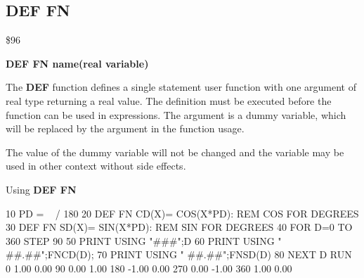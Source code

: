 
\newpage
\subsection{DEF FN}
\begin{description}[leftmargin=3cm,style=nextline]
\item [Token:] \$96
\item [Format:] {\bf DEF FN name(real variable)}
\item [Usage:] The {\bf DEF} function defines a single statement
               user function with one argument of real type
               returning a real value.
               The definition must be executed before the function
               can be used in expressions. The argument is
               a dummy variable, which will be replaced by the
               argument in the function usage.

\item [Remarks:] The value of the dummy variable will not be changed
                 and the variable may be used in other context
                 without side effects.

\item [Example:] Using {\bf DEF FN}
\begin{screenoutput}
10 PD = ~ / 180
20 DEF FN CD(X)= COS(X*PD): REM COS FOR DEGREES
30 DEF FN SD(X)= SIN(X*PD): REM SIN FOR DEGREES
40 FOR D=0 TO 360 STEP 90
50 PRINT USING "###";D
60 PRINT USING " ##.##";FNCD(D);
70 PRINT USING " ##.##";FNSD(D)
80 NEXT D
RUN
  0  1.00  0.00
 90  0.00  1.00
180 -1.00  0.00
270  0.00 -1.00
360  1.00  0.00
\end{screenoutput}
\end{description}


\newpage
